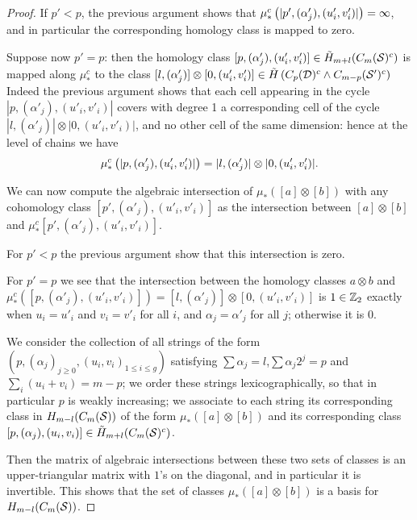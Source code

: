 \begin{proof}
If $p'<p$, the previous argument shows that $\mu^c_*\left(|p',(\alpha'_j),(u'_i,v'_i)|\right)=\infty$,
and in particular the corresponding homology class is mapped to zero.

Suppose now $p'=p$: then the homology class $[p,(\alpha'_j),(u'_i,v'_i)]\in \tilde{H}_{m+l}(C_m(\mathcal{S})^c)$
is mapped along $\mu^c_*$ to the class
$[l,(\alpha'_j)]\otimes [0,(u'_i,v'_i)]\in\tilde{H}\left(C_p(\mathcal{D})^c\wedge C_{m-p}(\mathcal{S}')^c\right)$
Indeed the previous
argument shows that each cell appearing in the cycle $|p,(\alpha'_j),(u'_i,v'_i)|$ covers with degree
1 a corresponding cell of the cycle $|l,(\alpha'_j)|\otimes |0,(u'_i,v'_i)|$, and no other cell
of the same dimension: hence at the level of chains we have 
\[
\mu^c_*\left(|p,(\alpha'_j),(u'_i,v'_i)|\right)=|l,(\alpha'_j)|\otimes |0,(u'_i,v'_i)|.
\]

We can now compute the algebraic intersection of $\mu_*([a]\otimes [b])$ with
any cohomology class $[p',(\alpha'_j),(u'_i,v'_i)]$ as the intersection between
$[a]\otimes [b]$ and $\mu^c_*[p',(\alpha'_j),(u'_i,v'_i)]$.

For $p'<p$ the previous argument show that this intersection is zero.

For $p'=p$ we see that the intersection between the homology classes
$a\otimes b$ and $\mu^c_*([p,(\alpha'_j),(u'_i,v'_i)])=[l,(\alpha'_j)]\otimes [0,(u'_i,v'_i)]$
is $1\in\mathbb{Z}_2$ exactly when $u_i=u'_i$ and $v_i=v'_i$ for all $i$, and $\alpha_j=\alpha'_j$
for all $j$; otherwise it is $0$.

We consider the collection of all strings of the form $(p,(\alpha_j)_{j\geq 0},(u_i,v_i)_{1\leq i\leq g})$
satisfying $\sum\alpha_j=l$,$\sum \alpha_j2^j=p$ and $\sum_i(u_i+v_i)=m-p$;
we order these strings lexicographically,
so that in particular $p$ is weakly increasing; we associate
to each string its corresponding class in $H_{m-l}(C_m(\mathcal{S}))$ of the form $\mu_*([a]\otimes [b])$ and its
corresponding class $[p,(\alpha_j),(u_i,v_i)]\in\tilde{H}_{m+l}(C_m(\mathcal{S})^c)$.

Then the matrix of algebraic intersections between these two sets of
classes is an upper-triangular matrix
with $1$'s on the diagonal, and in particular
it is invertible. This shows that the set of classes $\mu_*([a]\otimes [b])$
is a basis for $H_{m-l}(C_m(\mathcal{S}))$.


\end{proof}
